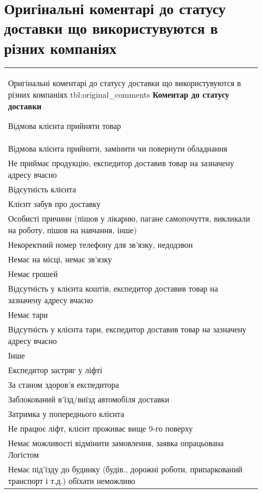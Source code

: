 \chapter{Оригінальні коментарі до статусу доставки що використувуются в різних компаніях} \label{AppendixA}

\begin{longtable}[c]{ | p{16cm} | }
	\longtableheader%
	{Оригінальні коментарі до статусу доставки що використувуются в різних компаніях}%
	{tbl:original_comments}%
	{\textbf{Коментар до статусу доставки}}
	
	Відмова клієнта прийняти товар \\
	\nopagebreak\quad Відмова клієнта прийняти, замінити чи повернути обладнання \\
	\nopagebreak\quad Не приймає продукцію, експедитор доставив товар на зазначену адресу вчасно \\
	\hline
	Відсутність клієнта \\
	\nopagebreak\quad Клієнт забув про доставку \\
	\nopagebreak\quad Особисті причини (пішов у лікарню, пагане самопочуття, викликали на роботу, пішов на навчання, інше) \\
	\nopagebreak\quad Некоректний номер телефону для зв'язку, недодзвон \\
	\nopagebreak\quad Немає на місці, немає зв'язку \\
	\hline
	Немає грошей \\
	\nopagebreak\quad Відсутність у клієнта коштів, експедитор доставив товар на зазначену адресу вчасно \\
	\hline
	Немає тари \\
	\nopagebreak\quad Відсутність у клієнта тари, експедитор доставив товар на зазначену адресу вчасно \\
	\hline
	Інше \\
	\nopagebreak\quad Експедитор застряг у ліфті \\
	\nopagebreak\quad За станом здоров’я експедитора \\
	\nopagebreak\quad Заблокований в'їзд/виїзд автомобіля доставки \\
	\nopagebreak\quad Затримка у попереднього клієнта \\
	\nopagebreak\quad Не працює ліфт, клієнт проживає вище 9-го поверху \\
	\nopagebreak\quad Немає можливості  відмінити замовлення, заявка опрацьована Логістом \\
	\nopagebreak\quad Немає під'їзду до будинку (будів., дорожні роботи, припаркований транспорт і т.д.) обїхати неможливо \\

\end{longtable}
